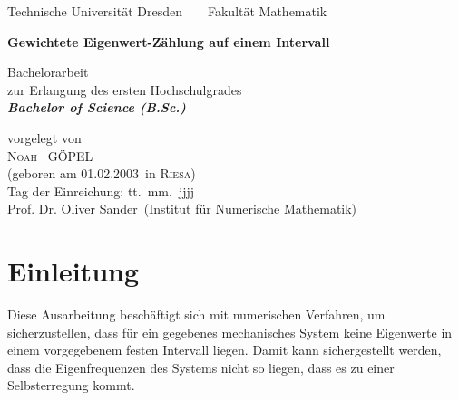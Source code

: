 \documentclass[a4paper,12pt]{report}
\newcommand{\name}{Göpel}
\newcommand{\vorname}{Noah}
\newcommand{\gebdatum}{01.02.2003}
\newcommand{\ort}{Riesa}
\newcommand{\betreuer}{Prof. Dr. Oliver Sander}
\newcommand{\institut}{Institut für Numerische Mathematik}
\newcommand{\thema}{Gewichtete Eigenwert-Zählung auf einem Intervall}
\newcommand{\datum}{tt.\ mm.\ jjjj} %
\theoremstyle{plain} %
\theoremstyle{definition} %
\theoremstyle{remark}
\begin{document}

\thispagestyle{empty}

\begin{center}
{\Large Technische Universit\"{a}t Dresden\  \ \textbullet\ \ Fakult\"{a}t Mathematik}

\vfil

{\bfseries\Huge\thema}

\vfil
{\LARGE
Bachelorarbeit \\[\bigskipamount]
zur Erlangung des ersten Hochschulgrades\\[\bigskipamount]
\bfseries{\itshape Bachelor of Science  \textup{(}B.Sc.\textup{)}}\\[\bigskipamount]
}

\vfil\vfil

\vfil

vorgelegt von
\\[\bigskipamount]
\textsc{\vorname\ } \MakeUppercase{\name}
\\[\bigskipamount]
(geboren am \gebdatum\ in \textsc{\ort})
\\[\bigskipamount]
Tag der Einreichung: \datum
\\[\bigskipamount]
\betreuer\ (\institut)
\end{center}

\cleardoublepage
\tableofcontents
\clearpage
\listofsymbols
\clearpage

\chapter{Einleitung}
\label{sec: Einleitung}
      
      Diese Ausarbeitung beschäftigt sich mit numerischen Verfahren, um sicherzustellen, dass für ein gegebenes mechanisches System keine Eigenwerte in einem vorgegebenem festen Intervall liegen.
      Damit kann sichergestellt werden, dass die Eigenfrequenzen des Systems nicht so liegen, dass es zu einer Selbsterregung kommt.

\end{document}
